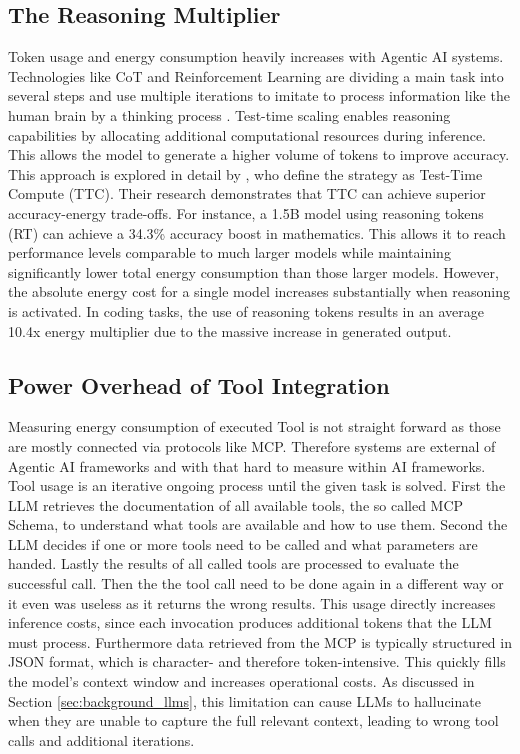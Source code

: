 \documentclass[10pt,twocolumn,letterpaper]{article}
\begin{document}
\subsection{The Reasoning Multiplier}
Token usage and energy consumption heavily increases with Agentic AI systems. Technologies like CoT and Reinforcement Learning are dividing a main task into several steps and use multiple iterations to imitate to process information like the human brain by a thinking process \citep{Han_Wang_Fang_Zhao_Ma_Chen_2025}. Test-time scaling enables reasoning capabilities by allocating additional computational resources during inference. This allows the model to generate a higher volume of tokens to improve accuracy. This approach is explored in detail by \cite{Jin_Wei_Brooks_2025}, who define the strategy as Test-Time Compute (TTC). Their research demonstrates that TTC can achieve superior accuracy-energy trade-offs. For instance, a 1.5B model using reasoning tokens (RT) can achieve a 34.3\% accuracy boost in mathematics. This allows it to reach performance levels comparable to much larger models while maintaining significantly lower total energy consumption than those larger models. However, the absolute energy cost for a single model increases substantially when reasoning is activated. In coding tasks, the use of reasoning tokens results in an average 10.4x energy multiplier due to the massive increase in generated output.

\subsection{Power Overhead of Tool Integration}
Measuring energy consumption of executed Tool is not straight forward as those are mostly connected via protocols like MCP. Therefore systems are external of Agentic AI frameworks and with that hard to measure within AI frameworks. Tool usage is an iterative ongoing process until the given task is solved. First the LLM retrieves the documentation of all available tools, the so called MCP Schema, to understand what tools are available and how to use them. Second the LLM decides if one or more tools need to be called and what parameters are handed. Lastly the results of all called tools are processed to evaluate the successful call. Then the the tool call need to be done again in a different way or it even was useless as it returns the wrong results. This usage directly increases inference costs, since each invocation produces additional tokens that the LLM must process. Furthermore data retrieved from the MCP is typically structured in JSON format, which is character- and therefore token-intensive. This quickly fills the model’s context window and increases operational costs. As discussed in Section \ref{sec:background_llms}, this limitation can cause LLMs to hallucinate when they are unable to capture the full relevant context, leading to wrong tool calls and additional iterations.
\end{document}
